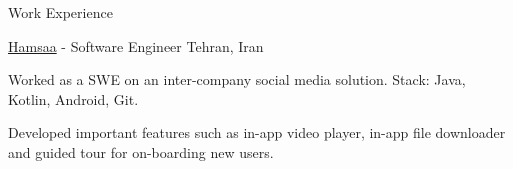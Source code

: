 \documentclass[../professional-cv.tex]{subfiles}
\begin{document}
\begin{rSection}{Work Experience}
	\begin{rSubsection}
		{\href{https://hamsaa.ir}{Hamsaa}}
		{  -  }
		{Software Engineer}
		{Tehran, Iran}
		\item Worked as a SWE on an inter-company social media solution. Stack: Java, Kotlin, Android, Git.
		\item Developed important features such as in-app video player, in-app file downloader and guided tour for on-boarding new users.

	\end{rSubsection}



\end{rSection}
\end{document}
